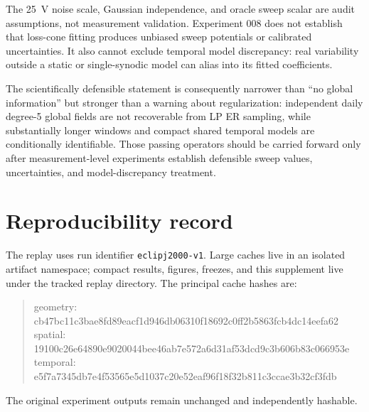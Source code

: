 \documentclass[11pt]{article}
\begin{document}
The 25~V noise scale, Gaussian independence, and oracle sweep scalar are audit
assumptions, not measurement validation.  Experiment 008 does not establish
that loss-cone fitting produces unbiased sweep potentials or calibrated
uncertainties.  It also cannot exclude temporal model discrepancy: real
variability outside a static or single-synodic model can alias into its fitted
coefficients.

The scientifically defensible statement is consequently narrower than ``no
global information'' but stronger than a warning about regularization:
independent daily degree-5 global fields are not recoverable from LP ER
sampling, while substantially longer windows and compact shared temporal
models are conditionally identifiable.  Those passing operators should be
carried forward only after measurement-level experiments establish defensible
sweep values, uncertainties, and model-discrepancy treatment.

\section{Reproducibility record}

The replay uses run identifier \texttt{eclipj2000-v1}.  Large caches live in an
isolated artifact namespace; compact results, figures, freezes, and this
supplement live under the tracked replay directory.  The principal cache
hashes are:
\begin{quote}
\scriptsize\ttfamily
geometry: cb47bc11c3bae8fd89eacf1d946db06310f18692c0ff2b5863fcb4dc14eefa62\\
spatial: 19100c26e64890e9020044bee46ab7e572a6d31af53dcd9c3b606b83c066953e\\
temporal: e5f7a7345db7e4f53565e5d1037c20e52eaf96f18f32b811c3ccae3b32cf3fdb
\end{quote}
The original experiment outputs remain unchanged and independently hashable.
\end{document}
